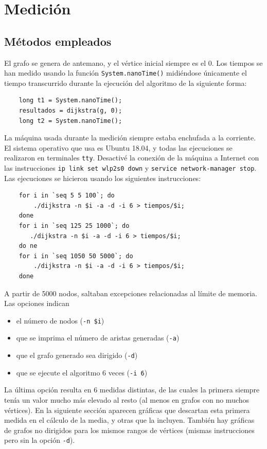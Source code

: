\documentclass[12pt , a4paper]{article}
\begin{document}
\section{Medición}
\subsection{Métodos empleados}
	El grafo se genera de antemano, y el vértice inicial siempre es el 0. Los tiempos se han medido usando la función \texttt{System.nanoTime()} midiéndose únicamente el tiempo transcurrido durante la ejecución del algoritmo de la siguiente forma:
	\begin{verbatim}
	long t1 = System.nanoTime();
	resultados = dijkstra(g, 0);
	long t2 = System.nanoTime();
	\end{verbatim}
	
	La máquina usada durante la medición siempre estaba enchufada a la corriente. El sistema operativo que usa es Ubuntu 18.04, y todas las ejecuciones se realizaron en terminales \texttt{tty}. Desactivé la conexión de la máquina a Internet con las instrucciones \texttt{ip link set wlp2s0 down} y \texttt{service network-manager stop}. Las ejecuciones se hicieron usando los siguientes instrucciones:
	\begin{verbatim}
	for i in `seq 5 5 100`; do 
	    ./dijkstra -n $i -a -d -i 6 > tiempos/$i; 
	done
	for i in `seq 125 25 1000`; do 
	   ./dijkstra -n $i -a -d -i 6 > tiempos/$i;
	do ne
	for i in `seq 1050 50 5000`; do 
	    ./dijkstra -n $i -a -d -i 6 > tiempos/$i; 
	done
	\end{verbatim}
	A partir de 5000 nodos, saltaban excepciones relacionadas al límite de memoria. Las opciones indican
	\begin{itemize}
		\item el número de nodos (\texttt{-n \$i})
		\item que se imprima el número de aristas generadas (\texttt{-a})
		\item que el grafo generado sea dirigido (\texttt{-d})
		\item que se ejecute el algoritmo 6 veces (\texttt{-i 6})
	\end{itemize} 
	La última opción resulta en 6 medidas distintas, de las cuales la primera siempre tenía un valor mucho más elevado al resto (al menos en grafos con no muchos vértices). En la siguiente sección aparecen gráficas que descartan esta primera medida en el cálculo de la media, y otras que la incluyen. También hay gráficas de grafos no dirigidos para los mismos rangos de vértices (mismas instrucciones pero sin la opción \texttt{-d}).
	
\end{document}
